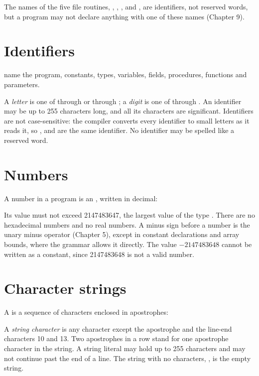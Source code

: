 The names of the five file routines, ,
, ,  and
, are identifiers, not reserved words, but a
program may not declare anything with one of these names (Chapter 9).

\section{Identifiers}
 name the program, constants, types, variables, fields,
procedures, functions and parameters.


A \textit{letter} is one of  through  or  through
; a \textit{digit} is one of  through .  An
identifier may be up to 255 characters long, and all its characters are
significant.  Identifiers are not case-sensitive: the compiler converts every
identifier to small letters as it reads it, so ,  and
 are the same identifier.  No identifier may be spelled like a
reserved word.

\section{Numbers}
A number in a program is an , written in decimal:


Its value must not exceed 2147483647, the largest value of the type
.  There are no hexadecimal numbers and no real numbers.  A
minus sign before a number is the unary minus operator (Chapter 5), except
in constant declarations and array bounds, where the grammar allows it
directly.  The value $-2147483648$ cannot be written as a constant, since
2147483648 is not a valid number.

\section{Character strings}
A  is a sequence of characters enclosed in
apostrophes:


A \textit{string character} is any character except the apostrophe and the
line-end characters 10 and 13.  Two apostrophes in a row stand for one
apostrophe character in the string.  A string literal may hold up to 255
characters and may not continue past the end of a line.  The string with no
characters, , is the empty string.

